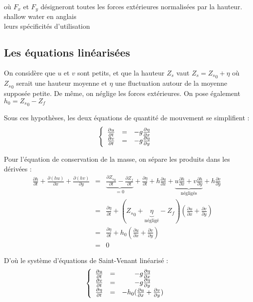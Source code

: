 où $F_x$ et $F_y$ désigneront toutes les forces extérieures normalisées par la hauteur. \\
shallow water en anglais\\
leurs spécificités d'utilisation\\

\subsection{Les équations linéarisées}

On considère que $u$ et $v$ sont petits, et que la hauteur $Z_s$ vaut $Z_s={Z_s}_0+\eta$ où ${Z_s}_0$ serait une hauteur moyenne et $\eta$ une fluctuation autour de la moyenne supposée petite. De même, on néglige les forces extérieures. On pose également $h_0 = {Z_s}_0 - Z_f$

Sous ces hypothèses, les deux équations de quantité de mouvement se simplifient :
\[\left\{\begin{array}{c c c}
	\frac{\partial u}{\partial t} &=& -g\frac{\partial \eta}{\partial x} \\
	\frac{\partial v}{\partial t} &=& -g\frac{\partial \eta}{\partial y} 
\end{array}\right.\]

Pour l'équation de conservation de la masse, on sépare les produits dans les dérivées :
\begin{eqnarray*}
	\frac{\partial h}{\partial t} + \frac{\partial (hu)}{\partial x} + \frac{\partial (hv)}{\partial y} &=& \underbrace{\frac{\partial {Z_s}_0}{\partial t} - \frac{\partial Z_f}{\partial t}}_{=0} + \frac{\partial \eta}{\partial t} + h\frac{\partial u}{\partial x} + \underbrace{u \frac{\partial h}{\partial x} + v\frac{\partial h}{\partial y}}_{\text{négligés}} + h\frac{\partial v}{\partial y} \\
	     &=&\frac{\partial \eta}{\partial t} + ({Z_s}_0 + \underbrace{\eta}_{\text{négligé}} - Z_f)\left(\frac{\partial u}{\partial x} + \frac{\partial v}{\partial y} \right) \\
	     &=&\frac{\partial \eta}{\partial t} + h_0\left(\frac{\partial u}{\partial x} + \frac{\partial v}{\partial y} \right) \\
		&=& 0
\end{eqnarray*}

D'où le système d'équations de Saint-Venant linéarisé :
\begin{equation}\label{II-4-4}
	\left\{ 
	\begin{array}{c c c}
		\frac{\partial u}{\partial t}	& = & -g \frac{\partial \eta}{\partial x}\\
		\frac{\partial v}{\partial t} & = & -g  \frac{\partial \eta}{\partial y}\\
      \frac{\partial \eta}{\partial t} & = & - h_0  (\frac{\partial u}{\partial x}+\frac{\partial v}{\partial y} )\\
		
		
	\end{array}
	\right.
\end{equation}
